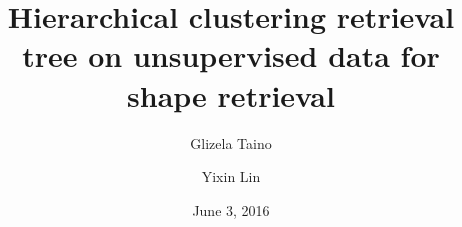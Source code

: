 \documentclass{article}
\begin{document}
\title{Hierarchical clustering retrieval tree on unsupervised data for shape retrieval}
\author{Glizela Taino}
\author{Yixin Lin }
\setcounter{Maxaffil}{0}
\renewcommand\Affilfont{\itshape\small}

\date{June 3, 2016}
\maketitle







\newpage


\end{document}
